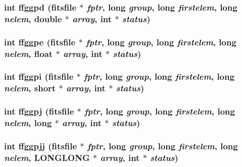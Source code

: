 \subsubsection{\setlength{\rightskip}{0pt plus 5cm}int ffggpd (\bf{fitsfile} $\ast$ {\em fptr}, long {\em group}, long {\em firstelem}, long {\em nelem}, double $\ast$ {\em array}, int $\ast$ {\em status})}\label{fitsio__64_8h_e50059a5fe73bbfe285c204a0fcbb81b}


\subsubsection{\setlength{\rightskip}{0pt plus 5cm}int ffggpe (\bf{fitsfile} $\ast$ {\em fptr}, long {\em group}, long {\em firstelem}, long {\em nelem}, float $\ast$ {\em array}, int $\ast$ {\em status})}\label{fitsio__64_8h_5d09492332cbecfe94b123b8a0defeb9}


\subsubsection{\setlength{\rightskip}{0pt plus 5cm}int ffggpi (\bf{fitsfile} $\ast$ {\em fptr}, long {\em group}, long {\em firstelem}, long {\em nelem}, short $\ast$ {\em array}, int $\ast$ {\em status})}\label{fitsio__64_8h_aeab60257fb251921567291948d553a2}


\subsubsection{\setlength{\rightskip}{0pt plus 5cm}int ffggpj (\bf{fitsfile} $\ast$ {\em fptr}, long {\em group}, long {\em firstelem}, long {\em nelem}, long $\ast$ {\em array}, int $\ast$ {\em status})}\label{fitsio__64_8h_99232aa89514e1335fced48812badbd8}


\subsubsection{\setlength{\rightskip}{0pt plus 5cm}int ffggpjj (\bf{fitsfile} $\ast$ {\em fptr}, long {\em group}, long {\em firstelem}, long {\em nelem}, \bf{LONGLONG} $\ast$ {\em array}, int $\ast$ {\em status})}\label{fitsio__64_8h_76b52ae73ab6d4139c2f8289663511c2}


